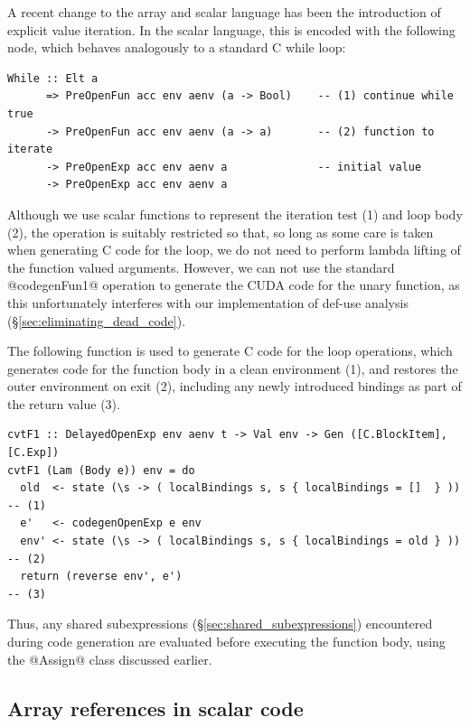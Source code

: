 A recent change to the array and scalar language has been the introduction of
explicit value iteration. In the scalar language, this is encoded with the
following \AST node, which behaves analogously to a standard C while loop:
%
\begin{lstlisting}[style=haskell]
While :: Elt a
      => PreOpenFun acc env aenv (a -> Bool)    -- (1) continue while true
      -> PreOpenFun acc env aenv (a -> a)       -- (2) function to iterate
      -> PreOpenExp acc env aenv a              -- initial value
      -> PreOpenExp acc env aenv a
\end{lstlisting}
%
Although we use scalar functions to represent the iteration test (1) and loop
body (2), the operation is suitably restricted so that, so long as some care is
taken when generating C code for the loop, we do not need to perform lambda
lifting of the function valued arguments. However, we can not use the standard
@codegenFun1@ operation to generate the CUDA code for the unary function,
as this unfortunately interferes with our implementation of def-use analysis
(\S\ref{sec:eliminating_dead_code}).

The following function is used to generate C code for the loop operations, which
generates code for the function body in a clean environment (1), and restores
the outer environment on exit (2), including any newly introduced bindings as
part of the return value (3).
%
\begin{lstlisting}[style=haskell]
cvtF1 :: DelayedOpenExp env aenv t -> Val env -> Gen ([C.BlockItem], [C.Exp])
cvtF1 (Lam (Body e)) env = do
  old  <- state (\s -> ( localBindings s, s { localBindings = []  } ))              -- (1)
  e'   <- codegenOpenExp e env
  env' <- state (\s -> ( localBindings s, s { localBindings = old } ))              -- (2)
  return (reverse env', e')                                                         -- (3)
\end{lstlisting}
%
Thus, any shared subexpressions (\S\ref{sec:shared_subexpressions}) encountered
during code generation are evaluated before executing the function body, using
the @Assign@ class discussed earlier.


\subsection{Array references in scalar code}

